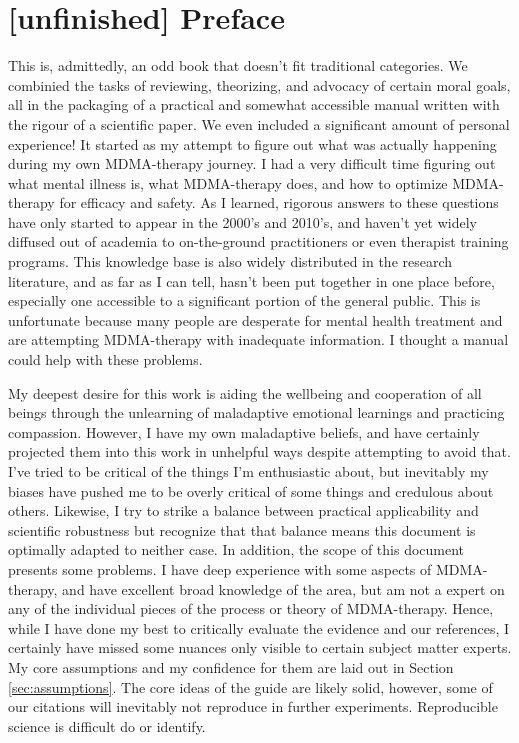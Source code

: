 \documentclass[12pt,letterpaper]{book}
\begin{document}
\chapter*{[unfinished] Preface}
This is, admittedly, an odd book that doesn't fit traditional categories. We combinied the tasks of reviewing, theorizing, and advocacy of certain moral goals, all in the packaging of a practical and somewhat accessible manual written with the rigour of a scientific paper. We even included a significant amount of personal experience! It started as my attempt to figure out what was actually happening during my own MDMA-therapy journey. I had a very difficult time figuring out what mental illness is, what MDMA-therapy does, and how to optimize MDMA-therapy for efficacy and safety. As I learned, rigorous answers to these questions have only started to appear in the 2000's and 2010's, and haven't yet widely diffused out of academia to on-the-ground practitioners or even therapist training programs. This knowledge base is also widely distributed in the research literature, and as far as I can tell, hasn't been put together in one place before, especially one accessible to a significant portion of the general public. This is unfortunate because many people are desperate for mental health treatment and are attempting MDMA-therapy with inadequate information. I thought a manual could help with these problems.


My deepest desire for this work is aiding the wellbeing and cooperation of all beings through the unlearning of maladaptive emotional learnings and practicing compassion. However, I have my own maladaptive beliefs, and have certainly projected them into this work in unhelpful ways despite attempting to avoid that. I've tried to be critical of the things I'm enthusiastic about, but inevitably my biases have pushed me to be overly critical of some things and credulous about others. Likewise, I try to strike a balance between practical applicability and scientific robustness but recognize that that balance means this document is optimally adapted to neither case. In addition, the scope of this document presents some problems. I have deep experience with some aspects of MDMA-therapy, and have excellent broad knowledge of the area, but am not a expert on any of the individual pieces of the process or theory of MDMA-therapy. Hence, while I have done my best to critically evaluate the evidence and our references, I certainly have missed some nuances only visible to certain subject matter experts. My core assumptions and my confidence for them are laid out in Section \ref{sec:assumptions}. The core ideas of the guide are likely solid, however, some of our citations will inevitably not reproduce in further experiments. Reproducible science is difficult do or identify.
\end{document}
